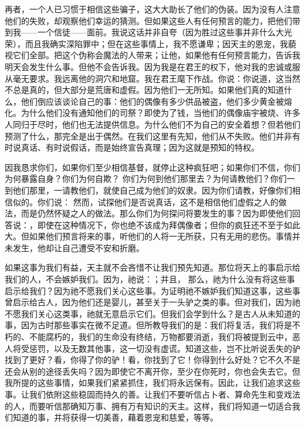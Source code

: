 再者，一个人已习惯于相信这些骗子，这大大助长了他们的伪装。因为没有人注意他们的失败，却观察他们幸运的猜测。但如果这些人有任何预言的能力，把他们带到我——一个信徒——面前。我说这话并非自夸（因为胜过这些事并非什么大光荣），而且我确实深陷罪中；但在这些事情上，我不愿谦卑；因天主的恩宠，我藐视它们全部。把这个伪称会魔法的人带来；让他，如果他有任何预言能力，告诉我明天会发生什么事。但他不会告诉我。因为我是在君王的权下，他对我的忠诚或服从毫无要求。我远离他的洞穴和地窟。我在君王麾下作战。你说：你说道，这当然不总是真的，但大部分是荒唐和虚假。因为他们一无所知。如果他们真的知道什么，他们倒应该谈论自己的事：他们的偶像有多少供品被盗，他们多少黄金被熔化。为什么他们没有通知他们的司祭？即使为了钱，当他们的偶像庙宇被烧、许多人同归于尽时，他们也无法提供信息。为什么他们不为自己的安全着想？但若他们预测了什么，那完全是出于偶然。在我们这里有先知，他们从不失败。他们并非有时说真话、有时说假话，而是始终宣告真理；因为这就是预知的特权。\par

因我恳求你们，如果你们至少相信基督，就停止这种疯狂吧；如果你们不信，你们为何暴露自身？你们为何自欺？ 你们为何到他们那里去？为何请教他们？你们一到他们那里，一请教他们，就使自己成为他们的奴隶。因为你们请教，好像你们相信似的。你们说： 然而，试探他们是否说真话，这不是相信他们虚假之人的做法，而是仍然怀疑之人的做法。那么你们为何探问将要发生的事？因为即使他们回答说：，即使在这种情况下，你也绝不该成为拜偶像者；但你的疯狂还不至于如此大。但如果他们预言将来的事，听他们的人将一无所获，只有无用的悲伤。事情并未发生，他却让自己遭受不安和折磨。\par

如果这事为我们有益，天主就不会吝惜不让我们预先知道。那位将天上的事启示给我们的人，不会嫉妒我们。因为，祂说：；并且， 那么，祂为什么没有将这些事启示给我们？因为祂不愿我们关心这些事。为证明祂不嫉妒我们知道这事，这些事曾启示给古人，因为他们还是婴儿，甚至关于一头驴之类的事。但对我们，因为祂不愿我们关心这类事，祂就无意启示它们。但我们会学到什么？是古人从未知道的事，因为古时那些事实在微不足道。但所教导我们的是：我们将复活，我们将是不朽的、不能腐朽的，我们的生命没有终结，万物都要消逝，我们将被提到云中，恶人将受惩罚，以及无数其他事，这一切没有虚谎。知道这些，岂不比听说丢失的驴找到了更好？看，你得了你的驴！看，你找到了它！你得到什么好处？它不久不是还会从别的途径丢失吗？因为即使它不离开你，至少在你死时，你也会失去它。但我所提的这些事情，如果我们紧紧抓住，我们将永远保有。因此，让我们追求这些事。让我们依附这些稳固而持久的善。让我们不要听信占卜者、算命先生和变戏法的人，而要听信那确知万事、拥有万有知识的天主。这样，我们将知道一切适合我们知道的事，并将获得一切美善，藉着恩宠和慈爱，等等。\par

